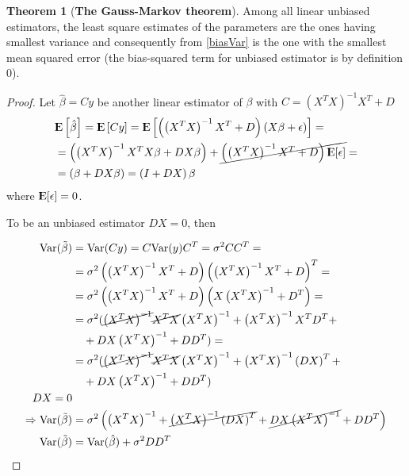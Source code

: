 \documentclass[12pt, letterpaper]{article}
\theoremstyle{definition}
\newcommand{\E}{{\rm I\kern-.3em E}}
\newcommand{\Var}{\mathrm{Var}}
\newtheorem{theorem}{Theorem}
\begin{document}
\begin{theorem}[\textbf{The Gauss-Markov theorem}]
Among all linear unbiased estimators, the least square estimates of the parameters are the ones having smallest variance and consequently from \ref{biasVar} is the one with the smallest mean squared error (the bias-squared term for unbiased estimator is by definition $0$).
\begin{proof}
Let $\hat{\beta} = Cy$ be another linear estimator of $\beta$ with $C = (X^TX)^{-1}X^T+D$
\begin{align}
&\E\left[ \hat{\beta} \right] = \E\left[ Cy \right] = \E\left[\left(\left(X^TX\right)^{-1}X^T+D\right) \left( X\beta+\epsilon\right)\right] =\\
& = \left(\left(X^TX\right)^{-1}X^T X\beta +DX\beta\right) +\cancel{\left(\left(X^TX\right)^{-1}X^T  +D\right) \E[\epsilon]}=\\
& = \left(\beta +DX\beta\right) = \left( I +DX\right) \beta\\
\end{align}
where $ \E[\epsilon] = 0$.

To be an unbiased estimator $DX = 0$, then

\begin{equation}
\begin{aligned}
\Var(\tilde{\beta}) &= \Var(Cy) = C\Var(y) C^T = \sigma^2 CC^T = \\
&= \sigma^2 \left( \left(X^T X\right)^{-1}X^T +D \right)    \left( \left(X^T X\right)^{-1}X^T+D\right)^T =\\
&= \sigma^2 \left( \left(X^T X\right)^{-1}X^T +D \right)    \left( X \left(X^TX\right)^{-1} + D^T \right)  =\\
&= \sigma^2 (  \cancel{\left(X^TX\right)^{-1}}\cancel{X^T X}   \left(X^TX\right)^{-1} +  \left(X^T X\right)^{-1}X^TD^T                          +\\
&\quad + D X \left(X^TX\right)^{-1} +DD^T) =\\
&= \sigma^2 (  \cancel{\left(X^TX\right)^{-1}}\cancel{X^T X}   \left(X^TX\right)^{-1} +  \left(X^T X\right)^{-1}\left( DX \right)^T                          +\\
&\quad + D X \left(X^TX\right)^{-1} +DD^T) \\
DX=0 \\\Rightarrow \Var(\tilde{\beta}) &= \sigma^2 \left( \left(X^TX\right)^{-1} +  \cancel{\left(X^T X\right)^{-1}\left( DX \right)^T }  + \cancel{D X \left(X^TX\right)^{-1} }+DD^T\right) \\
\Var(\tilde{\beta}) &= \Var(\hat{\beta})  + \sigma^2DD^T
\end{aligned}
\end{equation}

\end{proof}
\end{theorem}
\end{document}
